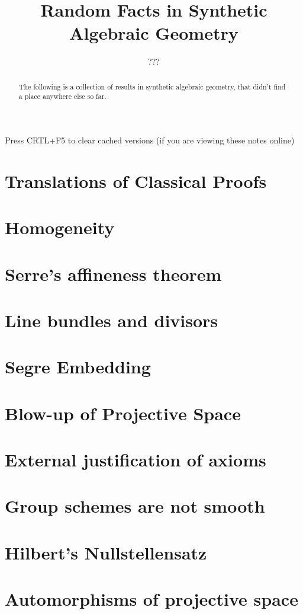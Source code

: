 \documentclass{../util/zariski}
\title{Random Facts in Synthetic Algebraic Geometry}
\author{???}
\begin{document}
\maketitle

\begin{center}
  \color{purple}
  \large{Press CRTL+F5 to clear cached versions}
  \large{(if you are viewing these notes online)}
\end{center}

\begin{abstract}
  The following is a collection of results in synthetic algebraic geometry,
  that didn't find a place anywhere else so far.
\end{abstract}

\tableofcontents

\section{Translations of Classical Proofs}


\section{Homogeneity}


\section{Serre's affineness theorem}


\section{Line bundles and divisors}


\section{Segre Embedding}


\section{Blow-up of Projective Space}


\section{External justification of axioms}


\section{Group schemes are not smooth}


\section{Hilbert's Nullstellensatz}


\section{Automorphisms of projective space}


\printindex

\printbibliography
\end{document}
